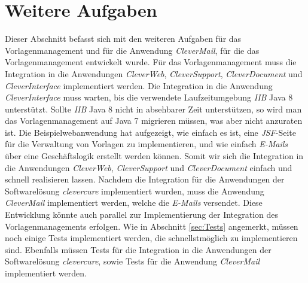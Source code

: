 \section{Weitere Aufgaben}
Dieser Abschnitt befasst sich mit den weiteren Aufgaben für das Vorlagenmanagement und für die Anwendung \emph{CleverMail}, für die das Vorlagenmanagement entwickelt wurde.
\newline
\newline
Für das Vorlagenmanagement muss die Integration in die Anwendungen \emph{CleverWeb}, \emph{CleverSupport}, \emph{CleverDocument} und \emph{CleverInterface} implementiert werden. Die Integration in die Anwendung \emph{CleverInterface} muss warten, bis die verwendete Laufzeitumgebung \emph{IIB} Java 8 unterstützt. Sollte \emph{IIB} Java 8 nicht in absehbarer Zeit unterstützen, so wird man das Vorlagenmanagement auf Java 7 migrieren müssen, was aber nicht anzuraten ist. 
\newline
\newline
Die Beispielwebanwendung hat aufgezeigt, wie einfach es ist, eine \emph{JSF}-Seite für die Verwaltung von Vorlagen zu implementieren, und wie einfach \emph{E-Mails} über eine Geschäftslogik erstellt werden können. Somit wir sich die Integration in die Anwendungen \emph{CleverWeb}, \emph{CleverSupport} und \emph{CleverDocument} einfach und schnell realisieren lassen.  
\newline
\newline
Nachdem die Integration für die Anwendungen der Softwarelösung \emph{clevercure} implementiert wurden, muss die Anwendung \emph{CleverMail} implementiert werden, welche die \emph{E-Mails} versendet. Diese Entwicklung könnte auch parallel zur Implementierung der Integration des Vorlagenmanagements erfolgen.
\newline
\newline
Wie in Abschnitt \ref{sec:Tests} angemerkt, müssen noch einige Tests implementiert werden, die schnellstmöglich zu implementieren sind. Ebenfalls müssen Tests für die Integration in die Anwendungen der Softwarelösung \emph{clevercure}, sowie Tests für die Anwendung \emph{CleverMail} implementiert werden. 

